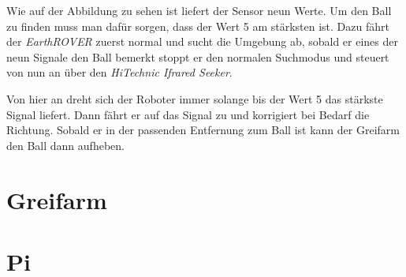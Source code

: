 Wie auf der Abbildung zu sehen ist liefert der Sensor neun Werte. Um den Ball zu finden muss man dafür sorgen, dass der Wert 5 am stärksten ist. Dazu fährt der \textit{EarthROVER} zuerst normal und sucht die Umgebung ab, sobald er eines der neun Signale den Ball bemerkt stoppt er den normalen Suchmodus und steuert von nun an über den \textit{HiTechnic Ifrared Seeker}.

Von hier an dreht sich der Roboter immer solange bis der Wert 5 das stärkste Signal liefert. Dann fährt er auf das Signal zu und korrigiert bei Bedarf die Richtung. Sobald er in der passenden Entfernung zum Ball ist kann der Greifarm den Ball dann aufheben.

\section{Greifarm}

\section{Pi}